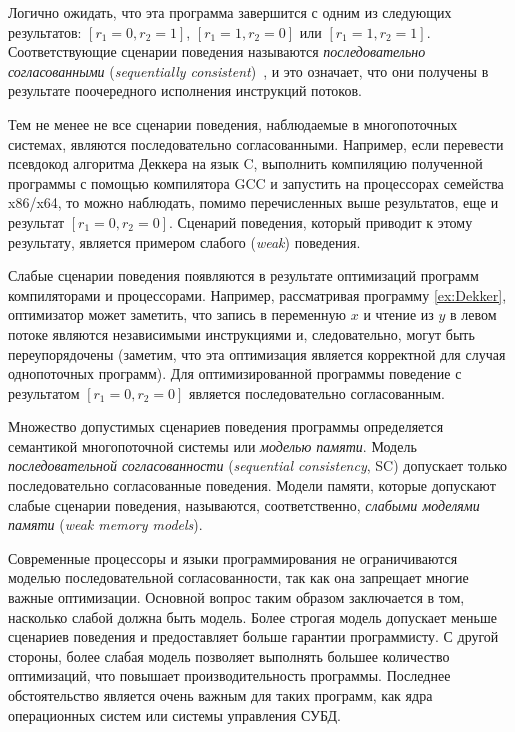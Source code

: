 Логично ожидать, что эта программа 
завершится с одним из следующих результатов: 
${[r_1=0, r_2=1]}$, ${[r_1=1,r_2=0]}$ или ${[r_1=1,r_2=1]}$. Соответствующие сценарии поведения 
называются \emph{последовательно согласованными} 
(\emph{sequentially consistent})~\cite{Lamport:TC79}, и это означает, 
что они получены в результате поочередного 
исполнения инструкций потоков. 



Тем не менее не все сценарии поведения, наблюдаемые в
многопоточных  системах, являются последовательно согласованными.
Например, если перевести псевдокод алгоритма Деккера
на язык C, выполнить компиляцию полученной программы с помощью компилятора GCC
и  запустить  на процессорах семейства x86/x64, то
можно  наблюдать, помимо перечисленных выше результатов, еще и результат  $[r_1=0, r_2=0]$. Сценарий поведения, который приводит к этому результату, является примером  слабого (\emph{weak}) поведения.

Слабые сценарии поведения появляются в результате оптимизаций программ
компиляторами и процессорами. Например, 
рассматривая программу \ref{ex:Dekker}, 
оптимизатор может заметить, что запись в переменную $x$
и чтение из $y$ в левом потоке являются независимыми инструкциями 
и, следовательно, могут быть переупорядочены
(заметим, что эта оптимизация является корректной 
для случая однопоточных программ).
Для оптимизированной программы поведение с результатом
$[r_1=0, r_2=0]$ является последовательно согласованным.

Множество допустимых сценариев поведения программы определяется
семантикой многопоточной системы или \emph{моделью памяти}.
Модель \emph{последовательной согласованности}
(\emph{sequential consistency}, SC) допускает 
только последовательно согласованные поведения.
Модели памяти, которые   допускают слабые сценарии поведения, 
называются, соответственно, \emph{слабыми моделями памяти}
(\emph{weak memory models}).

Современные процессоры и языки программирования 
не ограничиваются моделью последовательной согласованности, 
так как она запрещает многие важные оптимизации.
Основной вопрос таким образом заключается в том, насколько слабой 
должна быть модель. Более строгая модель допускает меньше сценариев поведения 
и предоставляет больше гарантии программисту.
С другой стороны, более слабая модель позволяет
выполнять большее количество оптимизаций, что повышает производительность программы. Последнее обстоятельство является очень важным для таких программ, как ядра операционных систем или системы управления СУБД. 

